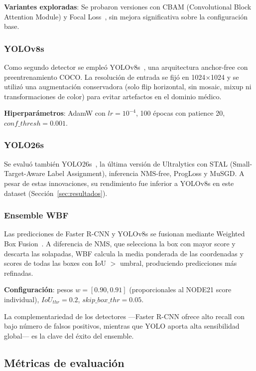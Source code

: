 \documentclass[conference]{IEEEtran}
\begin{document}
\textbf{Variantes exploradas}: Se probaron versiones con CBAM (Convolutional Block Attention Module) y Focal Loss~\cite{lin2017}, sin mejora significativa sobre la configuración base.

\subsubsection{YOLOv8s}

Como segundo detector se empleó YOLOv8s~\cite{yolov8}, una arquitectura anchor-free con preentrenamiento COCO. La resolución de entrada se fijó en 1024$\times$1024 y se utilizó una augmentación conservadora (solo flip horizontal, sin mosaic, mixup ni transformaciones de color) para evitar artefactos en el dominio médico.

\textbf{Hiperparámetros}: AdamW con $lr=10^{-4}$, 100 épocas con patience 20, $conf\_thresh=0.001$.

\subsubsection{YOLO26s}

Se evaluó también YOLO26s~\cite{yolo26}, la última versión de Ultralytics con STAL (Small-Target-Aware Label Assignment), inferencia NMS-free, ProgLoss y MuSGD. A pesar de estas innovaciones, su rendimiento fue inferior a YOLOv8s en este dataset (Sección~\ref{sec:resultados}).

\subsubsection{Ensemble WBF}

Las predicciones de Faster R-CNN y YOLOv8s se fusionan mediante Weighted Box Fusion~\cite{solovyev2021}. A diferencia de NMS, que selecciona la box con mayor score y descarta las solapadas, WBF calcula la media ponderada de las coordenadas y scores de todas las boxes con IoU $>$ umbral, produciendo predicciones más refinadas.

\textbf{Configuración}: pesos $w=[0.90, 0.91]$ (proporcionales al NODE21 score individual), $IoU_{thr}=0.2$, $skip\_box\_thr=0.05$.

La complementariedad de los detectores —Faster R-CNN ofrece alto recall con bajo número de falsos positivos, mientras que YOLO aporta alta sensibilidad global— es la clave del éxito del ensemble.

\subsection{Métricas de evaluación}
\end{document}

